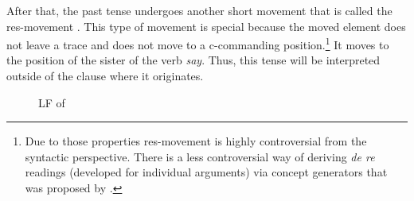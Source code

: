 \documentclass[output=paper,
modfonts,
newtxmath,
hidelinks
]{langscibook}
\begin{document}
After that, the past tense undergoes another short movement that is called the res-movement \citep{Heim1994}. This type of movement is special because the moved element does not leave a trace and does not move to a c-commanding position.\footnote{\label{20:fn10}Due to those properties res-movement is highly controversial from the syntactic perspective. There is a less controversial way of deriving \textit{de re} readings (developed for individual arguments) via concept generators that was proposed by \citet{PercusSauerland2003}.} It moves to the position of the sister of the verb \textit{say}. Thus, this tense will be interpreted outside of the clause where it originates.\largerpage[-3]

\begin{figure}
\caption{LF of }\label{20:ex35}
\end{figure}
\end{document}
